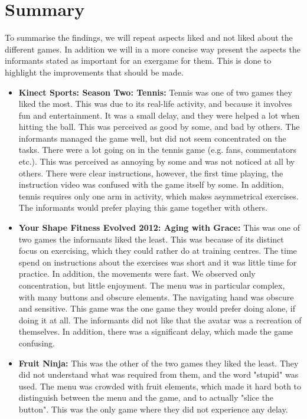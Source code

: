 \section{Summary}
To summarise the findings, we will repeat aspects liked and not liked about the different games. In addition we will in a more concise way present the aspects the informants stated as important for an exergame for them. This is done to highlight the improvements that should be made.

\begin{itemize}
\item \textbf{Kinect Sports: Season Two: Tennis:} Tennis was one of two games they liked the most. This was due to its real-life activity, and because it involves fun and entertainment. It was a small delay, and they were helped a lot when hitting the ball. This was perceived as good by some, and bad by others. The informants managed the game well, but did not seem concentrated on the tasks. There were a lot going on in the tennis game (e.g. fans, commentators etc.). This was perceived as annoying by some and was not noticed at all by others. There were clear instructions, however, the first time playing, the instruction video was confused with the game itself by some. In addition, tennis requires only one arm in activity, which makes asymmetrical exercises. The informants would prefer playing this game together with others. 

\item \textbf{Your Shape Fitness Evolved 2012: Aging with Grace:} This was one of two games the informants liked the least. This was because of its distinct focus on exercising, which they could rather do at training centres.  The time spend on instructions about the exercises was short and it was little time for practice. In addition, the movements were fast.  We observed only concentration, but little enjoyment. The menu was in particular complex, with many buttons and obscure elements. The navigating hand was obscure and sensitive. This game was the one game they would prefer doing alone, if doing it at all. The informants did not like that the avatar was a recreation of themselves. In addition, there was a significant delay, which made the game confusing.

\item \textbf{Fruit Ninja:} This was the other of the two games they liked the least.  They did not understand what was required from them, and the word "stupid" was used. The menu was crowded with fruit elements, which made it hard both to distinguish between the menu and the game, and to actually "slice the button". This was the only game where they did not experience any delay.


\end{itemize}
